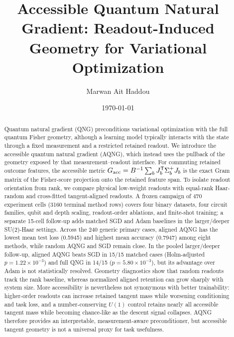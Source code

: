 \documentclass[aps,pra,reprint,superscriptaddress,nofootinbib]{revtex4-2}
\begin{document}
\title{Accessible Quantum Natural Gradient: Readout-Induced Geometry for Variational Optimization}
\author{Marwan Ait Haddou}
\date{\today}

\begin{abstract}
Quantum natural gradient (QNG) preconditions variational optimization with the full quantum Fisher geometry, although a learning model typically interacts with the state through a fixed measurement and a restricted retained readout. We introduce the accessible quantum natural gradient (AQNG), which instead uses the pullback of the geometry exposed by that measurement--readout interface. For commuting retained outcome features, the accessible metric $G_{\rm acc}=B^{-1}\sum_b J_b^{\mathsf T}\Sigma_b^{+}J_b$ is the exact Gram matrix of the Fisher-score projection onto the retained feature span. To isolate readout orientation from rank, we compare physical low-weight readouts with equal-rank Haar-random and cross-fitted tangent-aligned readouts. A frozen campaign of 470 experiment cells (3160 terminal method rows) covers four binary datasets, four circuit families, qubit and depth scaling, readout-order ablations, and finite-shot training; a separate 15-cell follow-up adds matched SGD and Adam baselines in the larger/deeper SU(2)-Haar settings. Across the 240 generic primary cases, aligned AQNG has the lowest mean test loss (0.5945) and highest mean accuracy (0.7947) among eight methods, while random AQNG and SGD remain close. In the pooled larger/deeper follow-up, aligned AQNG beats SGD in 15/15 matched cases (Holm-adjusted $p=1.22\times10^{-3}$) and full QNG in 14/15 ($p=5.80\times10^{-3}$), but its advantage over Adam is not statistically resolved. Geometry diagnostics show that random readouts track the rank baseline, whereas normalized aligned retention can grow sharply with system size. More accessibility is nevertheless not synonymous with better trainability: higher-order readouts can increase retained tangent mass while worsening conditioning and task loss, and a number-conserving $U(1)$ control retains nearly all accessible tangent mass while becoming chance-like as the descent signal collapses. AQNG therefore provides an interpretable, measurement-aware preconditioner, but accessible tangent geometry is not a universal proxy for task usefulness.
\end{abstract}
\maketitle










\end{document}
